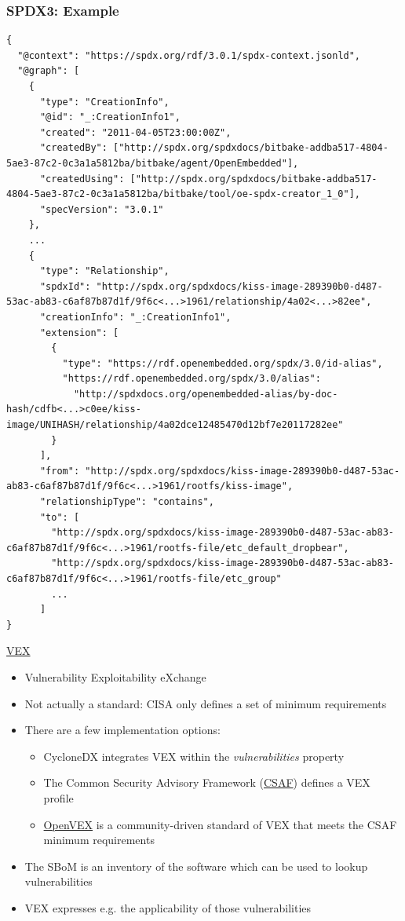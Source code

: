 \begin{frame}[fragile]
  \frametitle{SPDX3: Example}
    \begin{verbatim}
{
  "@context": "https://spdx.org/rdf/3.0.1/spdx-context.jsonld",
  "@graph": [
    {
      "type": "CreationInfo",
      "@id": "_:CreationInfo1",
      "created": "2011-04-05T23:00:00Z",
      "createdBy": ["http://spdx.org/spdxdocs/bitbake-addba517-4804-5ae3-87c2-0c3a1a5812ba/bitbake/agent/OpenEmbedded"],
      "createdUsing": ["http://spdx.org/spdxdocs/bitbake-addba517-4804-5ae3-87c2-0c3a1a5812ba/bitbake/tool/oe-spdx-creator_1_0"],
      "specVersion": "3.0.1"
    },
    ...
    {
      "type": "Relationship",
      "spdxId": "http://spdx.org/spdxdocs/kiss-image-289390b0-d487-53ac-ab83-c6af87b87d1f/9f6c<...>1961/relationship/4a02<...>82ee",
      "creationInfo": "_:CreationInfo1",
      "extension": [
        {
          "type": "https://rdf.openembedded.org/spdx/3.0/id-alias",
          "https://rdf.openembedded.org/spdx/3.0/alias": 
            "http://spdxdocs.org/openembedded-alias/by-doc-hash/cdfb<...>c0ee/kiss-image/UNIHASH/relationship/4a02dce12485470d12bf7e20117282ee"
        }
      ],
      "from": "http://spdx.org/spdxdocs/kiss-image-289390b0-d487-53ac-ab83-c6af87b87d1f/9f6c<...>1961/rootfs/kiss-image",
      "relationshipType": "contains",
      "to": [
        "http://spdx.org/spdxdocs/kiss-image-289390b0-d487-53ac-ab83-c6af87b87d1f/9f6c<...>1961/rootfs-file/etc_default_dropbear",
        "http://spdx.org/spdxdocs/kiss-image-289390b0-d487-53ac-ab83-c6af87b87d1f/9f6c<...>1961/rootfs-file/etc_group"
        ...
      ]
}
    \end{verbatim}
\end{frame}

\begin{frame}{\href{https://www.cisa.gov/resources-tools/resources/minimum-requirements-vulnerability-exploitability-exchange-vex}{VEX}}
  \begin{itemize}
    \item Vulnerability Exploitability eXchange
    \item Not actually a standard: CISA only defines a set of minimum requirements
    \item There are a few implementation options:
    \begin{itemize}
      \item CycloneDX integrates VEX within the \textit{vulnerabilities} property
      \item The Common Security Advisory Framework (\href{https://www.csaf.io/}{CSAF}) defines a VEX profile
      \item \href{https://openvex.dev/}{OpenVEX} is a community-driven standard of VEX that
            meets the CSAF minimum requirements
    \end{itemize}
    \item The SBoM is an inventory of the software which can be used to lookup vulnerabilities
    \item VEX expresses e.g. the applicability of those vulnerabilities
  \end{itemize}
\end{frame}

